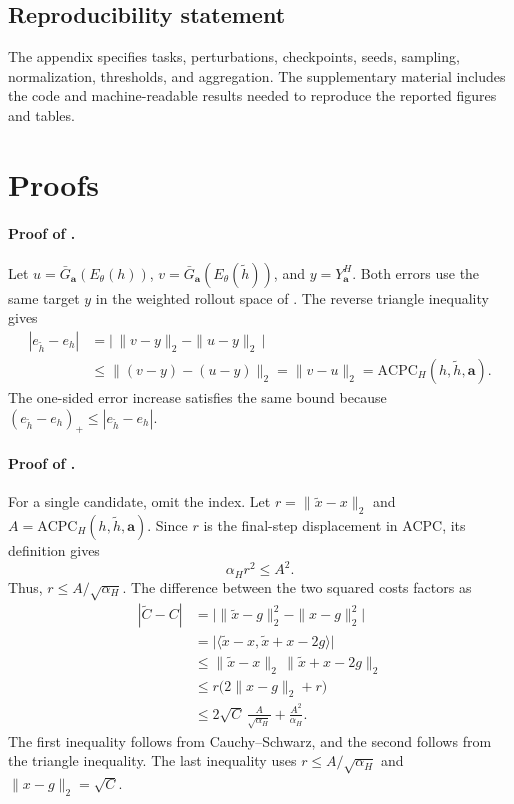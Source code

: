 \documentclass{article}
\begin{document}
\subsection*{Reproducibility statement}
The appendix specifies tasks, perturbations, checkpoints, seeds, sampling,
normalization, thresholds, and aggregation. The supplementary
material includes the code and machine-readable results needed to reproduce
the reported figures and tables.




\FloatBarrier
\appendix
\section{Proofs}\label{sec:appendix-acpc-proofs}

\paragraph{Proof of .}
Let $u=\bar G_{\mathbf a}(E_\theta(h))$,
$v=\bar G_{\mathbf a}(E_\theta(\tilde h))$, and $y=Y_{\mathbf a}^H$. Both
errors use the same target $y$ in the weighted rollout space of
. The reverse triangle inequality gives
\begin{align}
|e_{\tilde h}-e_h|
&=\bigl|\,\|v-y\|_2-\|u-y\|_2\,\bigr| \\
&\le \|(v-y)-(u-y)\|_2
=\|v-u\|_2
=\mathrm{ACPC}_H(h,\tilde h,\mathbf a).
\end{align}
The one-sided error increase satisfies the same bound because
$(e_{\tilde h}-e_h)_+\le|e_{\tilde h}-e_h|$.

\paragraph{Proof of .}
For a single candidate, omit the index. Let $r=\|\tilde x-x\|_2$ and
$A=\mathrm{ACPC}_H(h,\tilde h,\mathbf a)$. Since $r$ is the final-step
displacement in ACPC, its definition gives
\[
\alpha_H r^2\leq A^2.
\]
Thus, $r\leq A/\sqrt{\alpha_H}$. The difference between the two squared costs
factors as
\begin{align}
|\tilde C-C|
&=\bigl|\|\tilde x-g\|_2^2-\|x-g\|_2^2\bigr| \\
&=\bigl|\langle \tilde x-x,\tilde x+x-2g\rangle\bigr| \\
&\le \|\tilde x-x\|_2\,\|\tilde x+x-2g\|_2 \\
&\le r\bigl(2\|x-g\|_2+r\bigr) \\
&\le 2\sqrt C\,\frac{A}{\sqrt{\alpha_H}}
+\frac{A^2}{\alpha_H}.
\end{align}
The first inequality follows from Cauchy--Schwarz, and the second follows from
the triangle inequality. The last inequality uses $r\leq A/\sqrt{\alpha_H}$
and $\|x-g\|_2=\sqrt C$.
\end{document}
